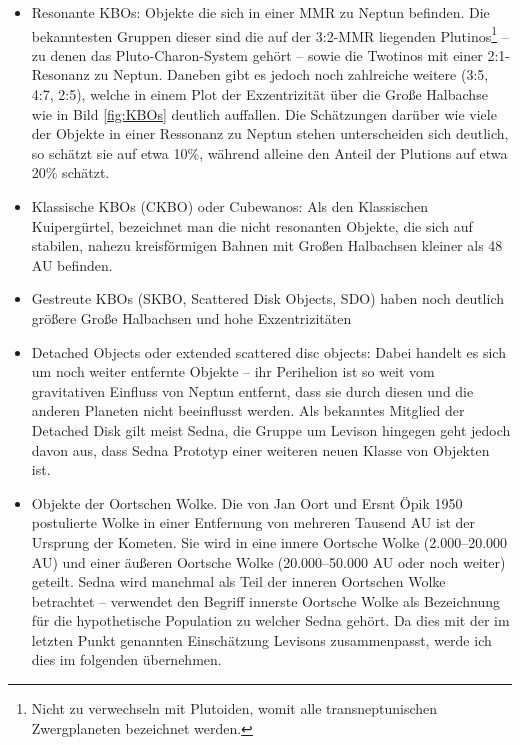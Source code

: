 \documentclass[12pt,a4paper,twoside]{article}
\begin{document}
\begin{itemize}
\item Resonante KBOs: Objekte die sich in einer MMR zu Neptun befinden. Die bekanntesten Gruppen dieser sind die auf der 3:2-MMR liegenden Plutinos\footnote{Nicht zu verwechseln mit Plutoiden, womit alle transneptunischen Zwergplaneten bezeichnet werden.} -- zu denen das Pluto-Charon-System gehört -- sowie die Twotinos mit einer 2:1-Resonanz zu Neptun. Daneben gibt es jedoch noch zahlreiche weitere (3:5, 4:7, 2:5), welche in einem Plot der Exzentrizität über die Große Halbachse wie in Bild \ref{fig:KBOs} deutlich auffallen\cite{Levison2008}. %
Die Schätzungen darüber wie viele der Objekte in einer Ressonanz zu Neptun stehen unterscheiden sich deutlich, %
so schätzt sie \cite{Trujillo2001,Levison2008} auf etwa 10\%, während \cite{Kavelaars2008,Levison2008} alleine den Anteil der Plutions auf etwa 20\% schätzt.
\item Klassische KBOs (CKBO) oder Cubewanos: Als den Klassischen Kuipergürtel, bezeichnet man die nicht resonanten Objekte, die sich auf stabilen, nahezu kreisförmigen Bahnen mit Großen Halbachsen kleiner als 48 AU befinden.
\item Gestreute KBOs (SKBO, Scattered Disk Objects, SDO) haben noch deutlich größere Große Halbachsen und hohe Exzentrizitäten %
\item Detached Objects oder extended scattered disc objects: Dabei handelt es sich um noch weiter entfernte Objekte -- ihr Perihelion ist so weit vom gravitativen Einfluss von Neptun entfernt, dass sie durch diesen und die anderen Planeten nicht beeinflusst werden. Als bekanntes Mitglied der Detached Disk gilt meist Sedna, die Gruppe um Levison hingegen geht jedoch davon aus, dass Sedna Prototyp einer weiteren neuen Klasse von Objekten ist\cite{Morbidelli2004,Kenyon2004,Brasser2006,Levison2008}. %
\item Objekte der Oortschen Wolke. Die von Jan Oort und Ersnt Öpik 1950 postulierte Wolke in einer Entfernung von mehreren Tausend AU ist der Ursprung der Kometen. Sie wird in eine innere Oortsche  Wolke (2.000–20.000 AU) und einer äußeren Oortsche Wolke (20.000–50.000 AU oder noch weiter) geteilt. Sedna wird manchmal als Teil der inneren Oortschen Wolke betrachtet – \cite{Brasser2008} verwendet den Begriff innerste Oortsche Wolke als Bezeichnung für die hypothetische Population zu welcher Sedna gehört. Da dies mit der im letzten Punkt genannten Einschätzung Levisons zusammenpasst, werde ich dies im folgenden übernehmen. %
\end{itemize} %
\end{document}
